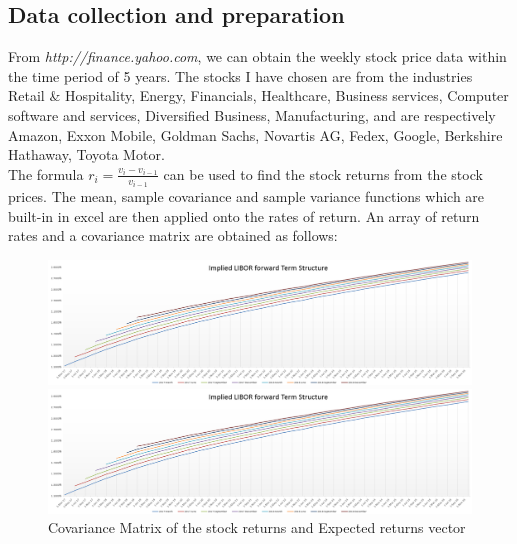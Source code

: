 \subsection{Data collection and preparation}
From \emph{http://finance.yahoo.com}, we can obtain the weekly stock price data within the time period of 5 years. The stocks I have chosen are from the industries Retail \& Hospitality, Energy, Financials, Healthcare, Business services, Computer software and services, Diversified Business, Manufacturing, and are respectively Amazon, Exxon Mobile, Goldman Sachs, Novartis AG, Fedex, Google, Berkshire Hathaway, Toyota Motor.\\[3mm]
The formula $r_{i} = \frac{v_{i}-v_{i-1}}{v_{i-1}}$ can be used to find the stock returns from the stock prices. The mean, sample covariance and sample variance functions which are built-in in excel are then applied onto the rates of return. An array of return rates and a covariance matrix are obtained as follows:
\begin{figure}[h]
  \centering
  \begin{minipage}[h]{0.85\textwidth}
    \includegraphics[width=\textwidth]{biu.PNG}
  \end{minipage}
  \hfill
  \begin{minipage}[h]{0.1\textwidth}
    \includegraphics[width=\textwidth]{biu.PNG}
  \end{minipage}
  \caption{Covariance Matrix of the stock returns and Expected returns vector}
\end{figure}

